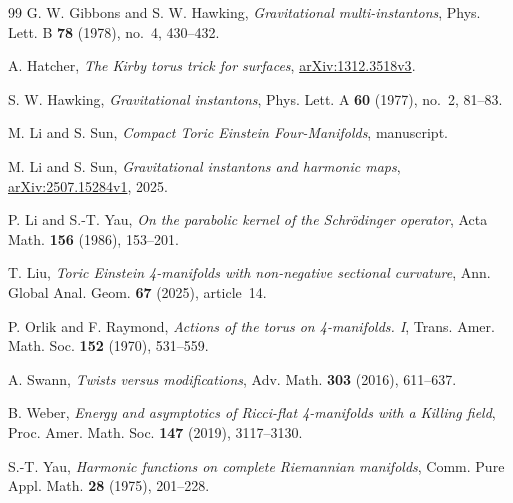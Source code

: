 \documentclass[letterpaper]{amsart}
\theoremstyle{definition}
\theoremstyle{remark}
\begin{document}
\begin{thebibliography}{99}
G. W. Gibbons and S. W. Hawking, \emph{Gravitational multi-instantons},
Phys. Lett. B \textbf{78} (1978), no.~4, 430--432.

A. Hatcher, \emph{The Kirby torus trick for surfaces},
\href{https://arxiv.org/abs/1312.3518v3}{arXiv:1312.3518v3}.

S. W. Hawking, \emph{Gravitational instantons},
Phys. Lett. A \textbf{60} (1977), no.~2, 81--83.

M. Li and S. Sun, \emph{Compact Toric Einstein Four-Manifolds},
manuscript.

M. Li and S. Sun, \emph{Gravitational instantons and harmonic maps},
\href{https://arxiv.org/abs/2507.15284v1}{arXiv:2507.15284v1}, 2025.

P. Li and S.-T. Yau, \emph{On the parabolic kernel of the Schr\"odinger operator},
Acta Math. \textbf{156} (1986), 153--201.

T. Liu, \emph{Toric Einstein 4-manifolds with non-negative sectional curvature},
Ann. Global Anal. Geom. \textbf{67} (2025), article~14.

P. Orlik and F. Raymond, \emph{Actions of the torus on 4-manifolds. I},
Trans. Amer. Math. Soc. \textbf{152} (1970), 531--559.

A. Swann, \emph{Twists versus modifications},
Adv. Math. \textbf{303} (2016), 611--637.

B. Weber, \emph{Energy and asymptotics of Ricci-flat 4-manifolds with a Killing field},
Proc. Amer. Math. Soc. \textbf{147} (2019), 3117--3130.

S.-T. Yau, \emph{Harmonic functions on complete Riemannian manifolds},
Comm. Pure Appl. Math. \textbf{28} (1975), 201--228.

\end{thebibliography}
\end{document}
